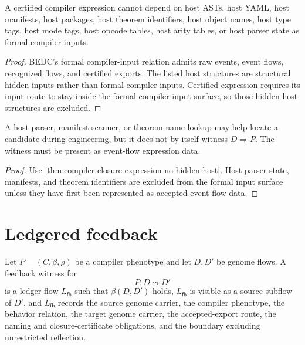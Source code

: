 \begin{theorem}
\label{thm:compiler-closure-expression-no-hidden-host}
A certified compiler expression cannot depend on host ASTs, host YAML, host
manifests, host packages, host theorem identifiers, host object names, host
type tags, host mode tags, host opcode tables, host arity tables, or host
parser state as formal compiler inputs.
\end{theorem}
\begin{proof}
BEDC's formal compiler-input relation admits raw events, event flows,
recognized flows, and certified exports. The listed host structures are
structural hidden inputs rather than formal compiler inputs. Certified
expression requires its input route to stay inside the formal compiler-input
surface, so those hidden host structures are excluded.
\end{proof}

\begin{corollary}
\label{cor:compiler-closure-expression-not-host-extraction}
A host parser, manifest scanner, or theorem-name lookup may help locate a
candidate during engineering, but it does not by itself witness
$D\Rightarrow P$. The witness must be present as event-flow expression data.
\end{corollary}
\begin{proof}
Use \autoref{thm:compiler-closure-expression-no-hidden-host}. Host parser
state, manifests, and theorem identifiers are excluded from the formal input
surface unless they have first been represented as accepted event-flow data.
\end{proof}

\section{Ledgered feedback}
\label{sec:compiler-closure-ledgered-feedback}

\begin{definition}
\label{def:compiler-closure-feedback-witness}
Let $P=(C,\beta,\rho)$ be a compiler phenotype and let $D,D'$ be genome flows.
A feedback witness for
$$
P:D\leadsto D'
$$
is a ledger flow $L_{\mathsf{fb}}$ such that $\beta(D,D')$ holds,
$L_{\mathsf{fb}}$ is visible as a source subflow of $D'$, and
$L_{\mathsf{fb}}$ records the source genome carrier, the compiler phenotype,
the behavior relation, the target genome carrier, the accepted-export route,
the naming and closure-certificate obligations, and the boundary excluding
unrestricted reflection.
\end{definition}

